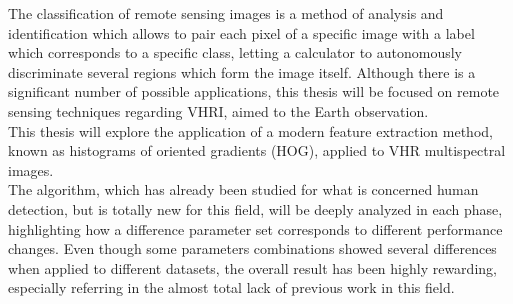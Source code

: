 
\english
\sommario

%
%
The classification of remote sensing images is a method of analysis and identification which allows to pair each pixel of a specific image with a label which corresponds to a specific class, letting a calculator to autonomously discriminate several regions which form the image itself.
Although there is a significant number of possible applications, this thesis will be focused on remote sensing techniques regarding VHRI, aimed to the Earth observation. \\
This thesis will explore the application of a modern feature extraction method, known as histograms of oriented gradients (HOG), applied to VHR multispectral images. \\
The algorithm, which has already been studied for what is concerned human detection, but is totally new for this field, will be deeply analyzed in each phase, highlighting how a difference parameter set corresponds to different performance changes. 
Even though some parameters combinations showed several differences when applied to different datasets, the overall result has been highly rewarding, especially referring in the almost total lack of previous work in this field.\\

